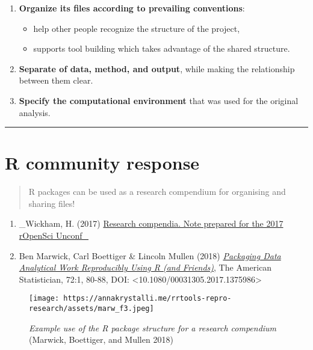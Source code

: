 \documentclass[
  letterpaper,
  DIV=11,
  numbers=noendperiod]{scrreprt}
\providecommand{\tightlist}{%
  \setlength{\itemsep}{0pt}\setlength{\parskip}{0pt}}\usepackage{longtable,booktabs,array}
\begin{document}
\begin{enumerate}
\def\labelenumi{\arabic{enumi}.}
\item
  \textbf{Organize its files according to prevailing conventions}:

  \begin{itemize}
  \tightlist
  \item
    help other people recognize the structure of the project,
  \item
    supports tool building which takes advantage of the shared
    structure.
  \end{itemize}
\item
  \textbf{Separate of data, method, and output}, while making the
  relationship between them clear.
\item
  \textbf{Specify the computational environment} that was used for the
  original analysis.
\end{enumerate}

\begin{center}\rule{0.5\linewidth}{0.5pt}\end{center}

\hypertarget{r-community-response}{%
\section*{R community response}\label{r-community-response}}

\begin{quote}
R packages can be used as a research compendium for organising and
sharing files!
\end{quote}

\begin{enumerate}
\def\labelenumi{\arabic{enumi}.}
\item
  \_Wickham, H. (2017)
  \href{https://docs.google.com/document/d/1LzZKS44y4OEJa4Azg5reGToNAZL0e0HSUwxamNY7E-Y/edit\#heading=h.blggi16hdosp}{Research
  compendia. Note prepared for the 2017 rOpenSci Unconf\_}
\item
  Ben Marwick, Carl Boettiger \& Lincoln Mullen (2018)
  \href{https://www.tandfonline.com/doi/abs/10.1080/00031305.2017.1375986?journalCode=utas20}{\emph{Packaging
  Data Analytical Work Reproducibly Using R (and Friends)}}, The
  American Statistician, 72:1, 80-88, DOI:
  \textless10.1080/00031305.2017.1375986\textgreater{}
\end{enumerate}

\begin{figure}

{\centering \texttt{[image: https://annakrystalli.me/rrtools-repro-research/assets/marw\_f3.jpeg]}

}

\caption{\emph{Example use of the R package structure for a research
compendium} (Marwick, Boettiger, and Mullen 2018)}

\end{figure}
\end{document}
